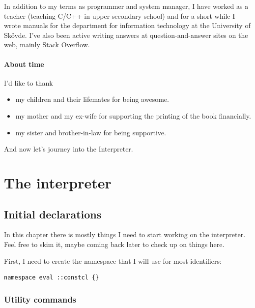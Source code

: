 \documentclass[a5paper,draft]{memoir}
\begin{document}
In addition to my terms as programmer and system manager, I have worked as a
teacher (teaching C/C++ in upper secondary school) and for a short while I
wrote manuals for the department for information technology at
the University of Skövde. I've also been active writing answers at
question-and-answer sites on the web, mainly Stack Overflow.

\subsection{About time}
\label{about-time}

I'd like to thank

\begin{itemize}
\item my children and their lifemates for being awesome.

\item my mother and my ex-wife for supporting the printing of the book financially.

\item my sister and brother-in-law for being supportive.
\end{itemize}

\vspace{1in}\noindent And now let's journey into the Interpreter.

\mainmatter
\pagestyle{headings}


\part{The interpreter}
\label{the-interpreter}

\chapter{Initial declarations}
\label{initial-declarations}

In this chapter there is mostly things I need to start working on the interpreter. Feel free to skim it, maybe coming back later to check up on things here.

First, I need to create the namespace that I will use for most identifiers:

\begin{lstlisting}
namespace eval ::constcl {}
\end{lstlisting}

\section{Utility commands}
\label{utility-commands}
\end{document}
